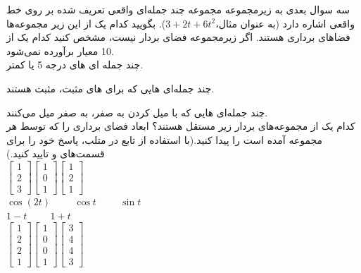 \documentclass[a4paper,12pt]{report}
\begin{document}
	 \hspace{-2.5cm}\textbf{}\hspace{0.6cm}
	 سه سوال بعدی به زیرمجموعه مجموعه چند جمله‌ای واقعی تعریف شده بر روی خط واقعی اشاره دارد (به عنوان مثال،$ 3+2t+6t^2 $). بگویید کدام یک از این زیر مجموعه‌ها فضاهای برداری هستند. اگر زیرمجموعه فضای بردار نیست، مشخص کنید کدام یک از 10 معیار برآورده نمی‌شود.\\
	 
	 \textbf{}
	 چند جمله ای های درجه 5 یا کمتر.
	 
	 \textbf{}
	 چند جمله‌ای هایی که برای های مثبت، مثبت هستند.
	 
	 \textbf{}
	 چند جمله‌ای هایی که با میل کردن  به صفر، به صفر میل می‌کنند.\\
	 
	 \hspace{-2.5cm}\textbf{}\hspace{0.6cm}
	 کدام یک از مجموعه‌های بردار زیر مستقل هستند؟ ابعاد فضای برداری را که توسط هر مجموعه آمده است را پیدا کنید.(با استفاده از تابع  در متلب، پاسخ خود را برای قسمت‌های  و  تایید کنید.)\\	 
	 
	 \textbf{}
	 $
	 \begin{bmatrix}
	 	1 \\ 2 \\ 3
	 \end{bmatrix}
 	 \begin{bmatrix}
 	 	1 \\ 0 \\ 1
 	 \end{bmatrix}
  	 \begin{bmatrix}
  	 	1 \\ 2 \\ 1
  	 \end{bmatrix}
	 $\\
	 	 
	 \textbf{}
	 $ 
	 \cos (2t) \hspace{1cm} \cos t \hspace{1cm} \sin t
	 $\\
	 
	 \textbf{}
	 $ 
	 1-t \hspace{1cm} 1+t
	 $\\
	 
	 \textbf{}
	 $ 
	 \begin{bmatrix}
	 	1 \\ 2 \\ 2 \\ 1
	 \end{bmatrix}
 	 \begin{bmatrix}
 	 	1 \\ 0 \\ 0 \\ 1
 	 \end{bmatrix}
  	 \begin{bmatrix}
  	 	3 \\ 4 \\ 4 \\ 3
  	 \end{bmatrix}
	 $\\
	 
\end{document}
